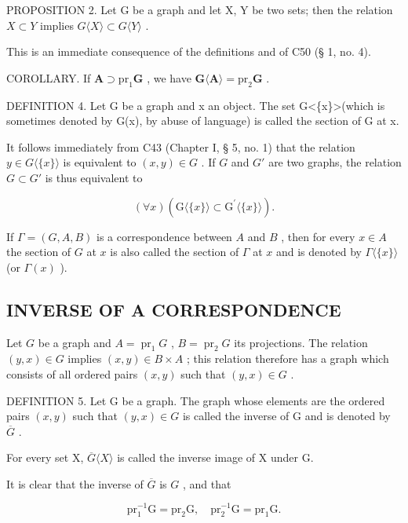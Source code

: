PROPOSITION 2. Let G be a graph and let X, Y be two sets; then the relation \(X \subset Y\) implies \(G\langle X\rangle \subset G\langle Y\rangle\) .

This is an immediate consequence of the definitions and of C50 (§ 1, no. 4).

COROLLARY. If \(\mathbf{A} \supset \mathrm{pr}_1\mathbf{G}\) , we have \(\mathbf{G}\langle \mathbf{A} \rangle = \mathrm{pr}_2\mathbf{G}\) .

DEFINITION 4. Let G be a graph and x an object. The set G\textless\{x\}\textgreater(which is sometimes denoted by G(x), by abuse of language) is called the section of G at x.

It follows immediately from C43 (Chapter I, § 5, no. 1) that the relation \(y \in G \langle \{x\} \rangle\) is equivalent to \((x, y) \in G\) . If \(G\) and \(G'\) are two graphs, the relation \(G \subset G'\) is thus equivalent to

\[
(\forall x) (\mathrm{G} \langle \{x \} \rangle \subset \mathrm{G} ^ {\prime} \langle \{x \} \rangle).
\]

If \(\Gamma = (G, A, B)\) is a correspondence between \(A\) and \(B\) , then for every \(x \in A\) the section of \(G\) at \(x\) is also called the section of \(\Gamma\) at \(x\) and is denoted by \(\Gamma \langle \{x\} \rangle\) (or \(\Gamma(x)\) ).

\subsection{INVERSE OF A CORRESPONDENCE}

Let \(G\) be a graph and \(A = \operatorname{pr}_1 G\) , \(B = \operatorname{pr}_2 G\) its projections. The relation \((y, x) \in G\) implies \((x, y) \in B \times A\) ; this relation therefore has a graph which consists of all ordered pairs \((x, y)\) such that \((y, x) \in G\) .

DEFINITION 5. Let G be a graph. The graph whose elements are the ordered pairs \((x, y)\) such that \((y, x) \in G\) is called the inverse of G and is denoted by \(\overline{G}\) .

For every set X, \(\overline{G}\langle X\rangle\) is called the inverse image of X under G.

It is clear that the inverse of \(\overline{G}\) is \(G\) , and that

\[
\mathrm{pr} _ {1} ^ {- 1} \mathrm{G} = \mathrm{pr} _ {2} \mathrm{G}, \quad \mathrm{pr} _ {2} ^ {- 1} \mathrm{G} = \mathrm{pr} _ {1} \mathrm{G}.
\]

